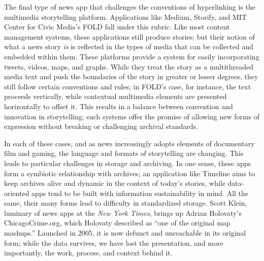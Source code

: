 The final type of news app that challenges the conventions of hyperlinking is the multimedia storytelling platform. Applications like Medium, Storify, and MIT Center for Civic Media's FOLD fall under this rubric. Like most content management systems, these applications still produce stories; but their notion of what a news story \emph{is} is reflected in the types of media that can be collected and embedded within them. These platforms provide a system for easily incorporating tweets, videos, maps, and graphs. While they treat the story as a multithreaded media text and push the boundaries of the story in greater or lesser degrees, they still follow certain conventions and rules; in FOLD's case, for instance, the text proceeds vertically, while contextual multimedia elements are presented horizontally to offset it. This results in a balance between convention and innovation in storytelling; such systems offer the promise of allowing new forms of expression without breaking or challenging archival standards.

In each of these cases, and as news increasingly adopts elements of documentary film and gaming, the language and formats of storytelling are changing. This leads to particular challenges in storage and archiving. In one sense, these apps form a symbiotic relationship with archives; an application like Timeline aims to keep archives alive and dynamic in the context of today's stories, while data-oriented apps tend to be built with information sustainability in mind. All the same, their many forms lead to difficulty in standardized storage. Scott Klein, luminary of news apps at the \emph{New York Times}, brings up Adrian Holovaty's ChicagoCrime.org, which Holovaty described as ``one of the original map mashups.''\autocite{holovaty_memory_2008} Launched in 2005, it is now defunct and unreachable in its original form; while the data survives, we have lost the presentation, and more importantly, the work, process, and context behind it.

